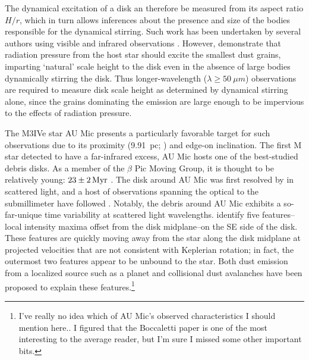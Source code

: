 \documentclass[12pt,oneside]{article}
\begin{document}
The dynamical excitation of a disk an therefore be measured from its aspect ratio $H/r$, which in turn allows inferences about the presence and size of the bodies responsible for the dynamical stirring.
Such work has been undertaken by several authors using visible and infrared observations \citep{artymowicz97,thebault&augereau07,quillen07}.
However, \cite{thebault09} demonstrate that radiation pressure from the host star should excite the smallest dust grains, imparting `natural' scale height to the disk even in the absence of large bodies dynamically stirring the disk. 
Thus longer-wavelength ($\lambda \geq \SI{50}{\mu m}$) observations are required to measure disk scale height as determined by dynamical stirring alone, since the grains dominating the emission are large enough to be impervious to the effects of radiation pressure.

The M3IVe star AU Mic presents a particularly favorable target for such observations due to its proximity (\SI{9.91}{pc}; \citealp{vanleeuwen07}) and edge-on inclination. 
The first M star detected to have a far-infrared excess, AU Mic hosts one of the best-studied debris disks. 
As a member of the $\beta$ Pic Moving Group, it is thought to be relatively young: $\SI{23 \pm 2}{Myr}$ \citep{binks&jeffries14,mamajek&bell14,malo14}. 
The disk around AU Mic was first resolved by \cite{kalas04} in scattered light, and a host of observations spanning the optical to the submillimeter have followed \citep{augereau&beust06,macgregor13,matthews15,schneider14,wang15}. 
Notably, the debris around AU Mic exhibits a so-far-unique time variability at scattered light wavelengths.
\cite{boccaletti15} identify five features--local intensity maxima offset from the disk midplane--on the SE side of the disk. 
These features are quickly moving away from the star along the disk midplane at projected velocities that are not consistent with Keplerian rotation; in fact, the outermost two features appear to be unbound to the star. Both dust emission from a localized source such as a planet \citep{boccaletti15,sezestre17} and collisional dust avalanches \citep{chiang&fung17} have been proposed to explain these features.\footnote{I've really no idea which of AU Mic's observed characteristics I should mention here.. I figured that the Boccaletti paper is one of the most interesting to the average reader, but I'm sure I missed some other important bits.}
\end{document}
